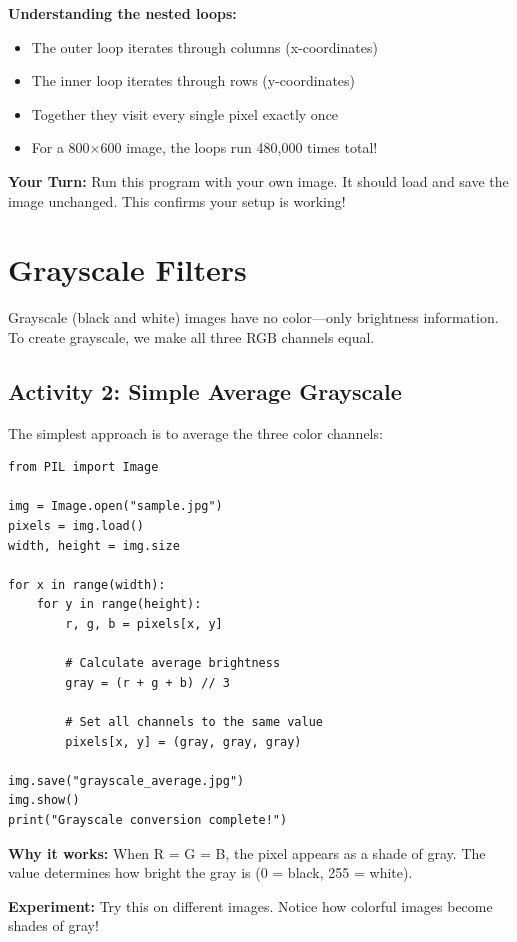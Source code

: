 \documentclass[11pt]{article}
\begin{document}
\textbf{Understanding the nested loops:}
\begin{itemize}
    \item The outer loop iterates through columns (x-coordinates)
    \item The inner loop iterates through rows (y-coordinates)
    \item Together they visit every single pixel exactly once
    \item For a 800×600 image, the loops run 480,000 times total!
\end{itemize}

\textbf{Your Turn:} Run this program with your own image. It should load and save the image unchanged. This confirms your setup is working!

\section{Grayscale Filters}

Grayscale (black and white) images have no color—only brightness information. To create grayscale, we make all three RGB channels equal.

\subsection*{Activity 2: Simple Average Grayscale}

The simplest approach is to average the three color channels:

\begin{lstlisting}
from PIL import Image

img = Image.open("sample.jpg")
pixels = img.load()
width, height = img.size

for x in range(width):
    for y in range(height):
        r, g, b = pixels[x, y]

        # Calculate average brightness
        gray = (r + g + b) // 3

        # Set all channels to the same value
        pixels[x, y] = (gray, gray, gray)

img.save("grayscale_average.jpg")
img.show()
print("Grayscale conversion complete!")
\end{lstlisting}

\textbf{Why it works:} When R = G = B, the pixel appears as a shade of gray. The value determines how bright the gray is (0 = black, 255 = white).

\textbf{Experiment:} Try this on different images. Notice how colorful images become shades of gray!
\end{document}
